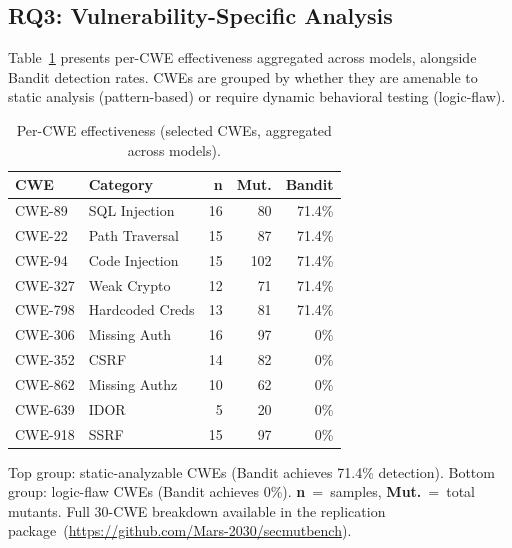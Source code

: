 \documentclass[sigconf,anonymous,review]{acmart}
\begin{document}
\smallskip\noindent{}\smallskip


\subsection{RQ3: Vulnerability-Specific Analysis}

Table~\ref{tab:rq3} presents per-CWE effectiveness aggregated across models, alongside Bandit detection rates. CWEs are grouped by whether they are amenable to static analysis (pattern-based) or require dynamic behavioral testing (logic-flaw).

\begin{table}[t]
\caption{Per-CWE effectiveness (selected CWEs, aggregated across models).}
\label{tab:rq3}
\small
\begin{tabular}{llrrr}
\toprule
\textbf{CWE} & \textbf{Category} & \textbf{n} & \textbf{Mut.} & \textbf{Bandit} \\
\midrule
CWE-89 & SQL Injection & 16 & 80 & 71.4\% \\
CWE-22 & Path Traversal & 15 & 87 & 71.4\% \\
CWE-94 & Code Injection & 15 & 102 & 71.4\% \\
CWE-327 & Weak Crypto & 12 & 71 & 71.4\% \\
CWE-798 & Hardcoded Creds & 13 & 81 & 71.4\% \\
\midrule
CWE-306 & Missing Auth & 16 & 97 & 0\% \\
CWE-352 & CSRF & 14 & 82 & 0\% \\
CWE-862 & Missing Authz & 10 & 62 & 0\% \\
CWE-639 & IDOR & 5 & 20 & 0\% \\
CWE-918 & SSRF & 15 & 97 & 0\% \\
\bottomrule
\end{tabular}
\vspace{2pt}
{\footnotesize Top group: static-analyzable CWEs (Bandit achieves 71.4\% detection). Bottom group: logic-flaw CWEs (Bandit achieves 0\%). \textbf{n}~=~samples, \textbf{Mut.}~=~total mutants. Full 30-CWE breakdown available in the replication package~(\url{https://github.com/Mars-2030/secmutbench}).}
\end{table}
\end{document}
